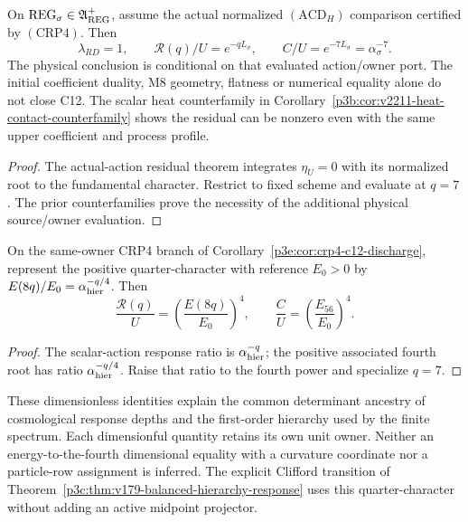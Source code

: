 \documentclass[12pt,a4paper]{article}
\begin{document}
\begin{corollary}
\label{p3e:cor:crp4-c12-discharge}
On $\mathrm{REG}_\sigma\in\mathfrak A_{\rm REG}^{+}$, assume the
actual normalized $(\mathrm{ACD}_H)$ comparison certified by
$(\mathrm{CRP4})$. Then
\[
 \boxed{\lambda_{RD}=1,\qquad
 \mathcal R(q)/U=e^{-qL_\sigma},\qquad
 C/U=e^{-7L_\sigma}=\alpha_\sigma^{-7}.}
\]
The physical conclusion is conditional on that evaluated action/owner port.
The initial coefficient duality, M8 geometry, flatness or numerical equality
alone do not close C12. The scalar heat counterfamily in
Corollary~\ref{p3b:cor:v2211-heat-contact-counterfamily} shows the residual
can be nonzero even with the same upper coefficient and process profile.
\end{corollary}
\begin{proof}
The actual-action residual theorem integrates $\eta_U=0$ with its normalized
root to the fundamental character. Restrict to fixed scheme and evaluate at
$q=7$. The prior counterfamilies prove the necessity of the additional
physical source/owner evaluation.
\end{proof}

\begin{corollary}
\label{p3e:cor:v179-response-energy-quarter-character}
On the same-owner CRP4 branch of
Corollary~\ref{p3e:cor:crp4-c12-discharge}, represent the positive
quarter-character with reference \(E_0>0\) by
\(E(8q)/E_0=\alpha_{\rm hier}^{-q/4}\).  Then
\[
 \frac{\mathcal R(q)}U
   =\left(\frac{E(8q)}{E_0}\right)^4,\qquad
 \frac CU=\left(\frac{E_{56}}{E_0}\right)^4 .
\]
\end{corollary}
\begin{proof}
The scalar-action response ratio is \(\alpha_{\rm hier}^{-q}\);
the positive associated fourth root has ratio
\(\alpha_{\rm hier}^{-q/4}\).  Raise that ratio to the fourth power and
specialize \(q=7\).
\end{proof}

These dimensionless identities explain the common determinant ancestry
of cosmological response depths and the first-order hierarchy used by
the finite spectrum.  Each dimensionful quantity retains its own unit
owner.  Neither an energy-to-the-fourth dimensional equality with a
curvature coordinate nor a particle-row assignment is inferred.
The explicit Clifford transition of
Theorem~\ref{p3c:thm:v179-balanced-hierarchy-response} uses this
quarter-character without adding an active midpoint projector.
\end{document}
